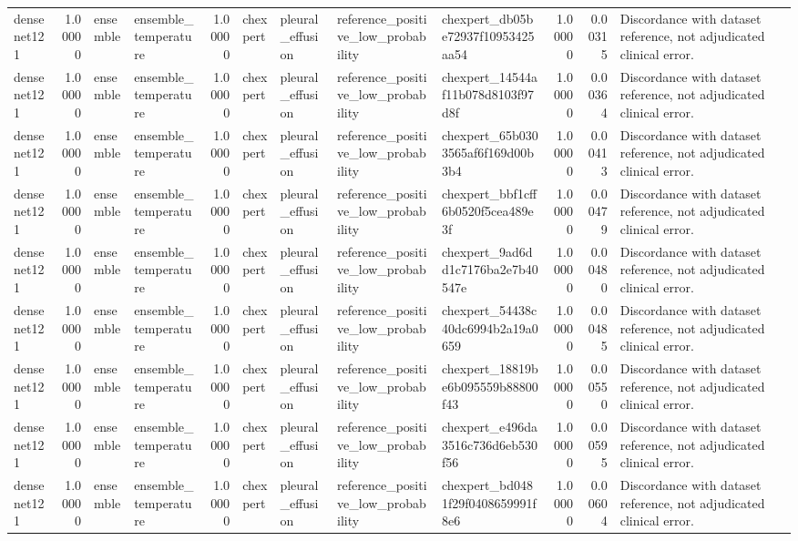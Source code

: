 \begin{tabular}{lrllrllllrrl}
densenet121 & 1.00000 & ensemble & ensemble\_temperature & 1.00000 & chexpert & pleural\_effusion & reference\_positive\_low\_probability & chexpert\_db05be72937f10953425aa54 & 1.00000 & 0.00315 & Discordance with dataset reference, not adjudicated clinical error. \\
densenet121 & 1.00000 & ensemble & ensemble\_temperature & 1.00000 & chexpert & pleural\_effusion & reference\_positive\_low\_probability & chexpert\_14544af11b078d8103f97d8f & 1.00000 & 0.00364 & Discordance with dataset reference, not adjudicated clinical error. \\
densenet121 & 1.00000 & ensemble & ensemble\_temperature & 1.00000 & chexpert & pleural\_effusion & reference\_positive\_low\_probability & chexpert\_65b0303565af6f169d00b3b4 & 1.00000 & 0.00413 & Discordance with dataset reference, not adjudicated clinical error. \\
densenet121 & 1.00000 & ensemble & ensemble\_temperature & 1.00000 & chexpert & pleural\_effusion & reference\_positive\_low\_probability & chexpert\_bbf1cff6b0520f5cea489e3f & 1.00000 & 0.00479 & Discordance with dataset reference, not adjudicated clinical error. \\
densenet121 & 1.00000 & ensemble & ensemble\_temperature & 1.00000 & chexpert & pleural\_effusion & reference\_positive\_low\_probability & chexpert\_9ad6dd1c7176ba2e7b40547e & 1.00000 & 0.00480 & Discordance with dataset reference, not adjudicated clinical error. \\
densenet121 & 1.00000 & ensemble & ensemble\_temperature & 1.00000 & chexpert & pleural\_effusion & reference\_positive\_low\_probability & chexpert\_54438c40dc6994b2a19a0659 & 1.00000 & 0.00485 & Discordance with dataset reference, not adjudicated clinical error. \\
densenet121 & 1.00000 & ensemble & ensemble\_temperature & 1.00000 & chexpert & pleural\_effusion & reference\_positive\_low\_probability & chexpert\_18819be6b095559b88800f43 & 1.00000 & 0.00550 & Discordance with dataset reference, not adjudicated clinical error. \\
densenet121 & 1.00000 & ensemble & ensemble\_temperature & 1.00000 & chexpert & pleural\_effusion & reference\_positive\_low\_probability & chexpert\_e496da3516c736d6eb530f56 & 1.00000 & 0.00595 & Discordance with dataset reference, not adjudicated clinical error. \\
densenet121 & 1.00000 & ensemble & ensemble\_temperature & 1.00000 & chexpert & pleural\_effusion & reference\_positive\_low\_probability & chexpert\_bd0481f29f0408659991f8e6 & 1.00000 & 0.00604 & Discordance with dataset reference, not adjudicated clinical error. \\

\end{tabular}
